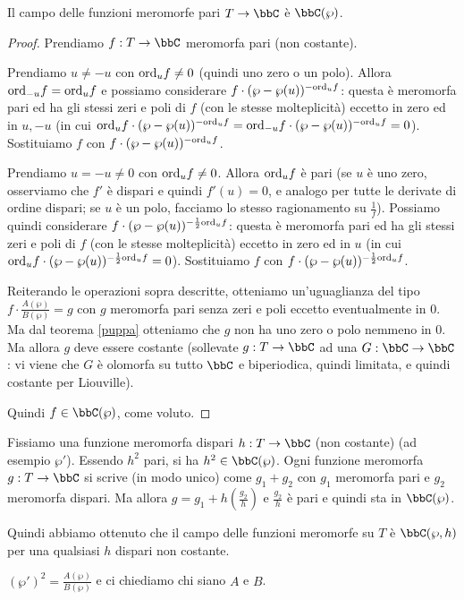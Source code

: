 \begin{teorema}
Il campo delle funzioni meromorfe pari $T\rar\bbC$ è $\bbC(\wp)$.
\end{teorema}
\begin{proof}
Prendiamo $f:T\rar\bbC$ meromorfa pari (non costante).

Prendiamo $u\not=-u$ con $\text{ord}_uf\not=0$ (quindi uno zero o un polo). Allora $\text{ord}_{-u}f=\text{ord}_uf$ e possiamo considerare $f\cdot(\wp-\wp(u))^{-\text{ord}_uf}$:
questa è meromorfa pari ed ha gli stessi zeri e poli di $f$ (con le stesse molteplicità) eccetto
in zero ed in $u,-u$ (in cui $\text{ord}_uf\cdot(\wp-\wp(u))^{-\text{ord}_uf}=\text{ord}_{-u}f\cdot(\wp-\wp(u))^{-\text{ord}_uf}=0$).
Sostituiamo $f$ con $f\cdot(\wp-\wp(u))^{-\text{ord}_uf}$.

Prendiamo $u=-u\not=0$ con $\text{ord}_uf\not=0$. Allora $\text{ord}_uf$ è pari (se $u$ è uno zero, osserviamo che $f'$ è dispari e quindi $f'(u)=0$, e analogo per tutte le derivate di ordine dispari;
se $u$ è un polo, facciamo lo stesso ragionamento su $\frac{1}{f}$). Possiamo quindi considerare $f\cdot(\wp-\wp(u))^{-\frac{1}{2}\text{ord}_uf}$:
questa è meromorfa pari ed ha gli stessi zeri e poli di $f$ (con le stesse molteplicità) eccetto in zero ed in $u$ (in cui $\text{ord}_uf\cdot(\wp-\wp(u))^{-\frac{1}{2}\text{ord}_uf}=0$).
Sostituiamo $f$ con $f\cdot(\wp-\wp(u))^{-\frac{1}{2}\text{ord}_uf}$.

Reiterando le operazioni sopra descritte, otteniamo un'uguaglianza del tipo $f\cdot\frac{A(\wp)}{B(\wp)}=g$ con $g$ meromorfa pari senza zeri e poli eccetto eventualmente in $0$.
Ma dal teorema \ref{puppa} otteniamo che $g$ non ha uno zero o polo nemmeno in $0$. Ma allora $g$ deve essere costante
(sollevate $g:T\rar\bbC$ ad una $G:\bbC\rar\bbC$: vi viene che $G$ è olomorfa su tutto $\bbC$ e biperiodica, quindi limitata, e quindi costante per Liouville).

Quindi $f\in\bbC(\wp)$, come voluto.
\end{proof}


Fissiamo una funzione meromorfa dispari $h:T\rar\bbC$ (non costante) (ad esempio $\wp'$).
Essendo $h^2$ pari, si ha $h^2\in\bbC(\wp)$.
Ogni funzione meromorfa $g:T\rar\bbC$ si scrive (in modo unico) come $g_1+g_2$ con $g_1$ meromorfa pari e $g_2$ meromorfa dispari.
Ma allora $g=g_1+h(\frac{g_2}{h})$ e $\frac{g_2}{h}$ è pari e quindi sta in $\bbC(\wp)$.

Quindi abbiamo ottenuto che il campo delle funzioni meromorfe su $T$ è $\bbC(\wp,h)$ per una qualsiasi $h$ dispari non costante.


$(\wp')^2=\frac{A(\wp)}{B(\wp)}$ e ci chiediamo chi siano $A$ e $B$.

